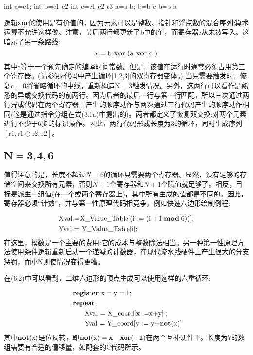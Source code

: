 \begin{CJK}{UTF8}{gbsn}
\begin{algorithm}

	  \Register int  a=c1;  
 \Register int  b=c1 \Xor c2 \;
 \Constant int  c=c1 \Xor c2 \Xor c3 \;
 \Repeat {}  
 a=a \Xor b;  
 b=b \Xor c \; 
 b=b \Xor a \;
 	 \end{algorithm}
\DecMargin{1em} 
逻辑\textbf{xor}的使用是有价值的，因为元素可以是整数、指针和浮点数的混合序列;算术运算不允许这样做。注意，最后两行都更新了b中的值，而寄存器c从未被写入。这暗示了另一条路线:
$$
\mathrm{b}:=\mathrm{b} \text { \textbf{xor} (a \textbf{xor} } \mathrm{c} \text { ) }
$$
其中$\mathrm{c}$等于一个预先确定的编译时间常数。但是，该值在运行时通常必须占用第三个寄存器。(请参阅c代码中产生循环[1,2,3]的双寄存器变体。)
当只需要触发时，修复$\mathrm{c}=0$将省略循环的中线，重新构造$\mathrm{N}=3$触发情况。另外，这两行可以看作是熟悉的异或交换代码的前两行。因为后者的最后一行与第一行匹配，所以三次通过两行异或代码在两个寄存器上产生的顺序动作与两次通过三行代码产生的顺序动作相同(这是通过指令分组在式(3.1a)中提出的)。两者都定义了恢复双交换:对两个元素进行不少于6步的标识操作。因此，两行代码形成长度为3的循环，同时生成序列$[\mathrm{r} 1, \mathrm{r} 1 \oplus \mathrm{r} 2, \mathrm{r} 2]$。


\subsection*{$\mathbf{N=3,4,6}$}
值得注意的是，长度不超过$N=6$的循环只需要两个寄存器。显然，没有足够的存储空间来交换所有元素，否则$N+1个$寄存器和$N+1个$赋值就足够了。相反，目标是派生一组值(在一个或两个寄存器上)，其中所有生成的值都是不同的。因此，寄存器必须“计数”，并与第一性原理代码相竞争，例如快速六边形绘制例程:

$$
\begin{aligned}
&\text{Xval =X\_Value\_Table[(i := (i +1 \textbf{mod} 6))];} \\
&\text{Yval = Y\_Value\_Table[i];}
\end{aligned}
$$
在这里，模数是一个主要的费用:它的成本与整数除法相当。另一种第一性原理方法使用条件逻辑重新启动一个递减的计数器，在现代流水线硬件上产生很大的分支惩罚，而小N则使情况变得更糟。

在(6.2)中可以看到，二维六边形的顶点生成可以使用这样的六重循环:

$$
\begin{aligned}
&\text { \textbf{register} } \mathrm{x}=\mathrm{y}=1 \text {; } \\
&\text { \textbf{repeat} }\\
&\qquad \text {Xval = X\_coord[x :=x+y] ;}\\
&\qquad \text {Yval = Y\_coord[y := y+\textbf{not}(x)]}
\end{aligned}
$$
其中$\bf{not}(\mathrm{x})$是位反转，即$\bf{not}(\mathrm{x})=x \quad \bf{xor} (-1)$在两个互补硬件下。长度为7的数组需要有合适的偏移量，如配套的C代码所示。



\end{CJK}
